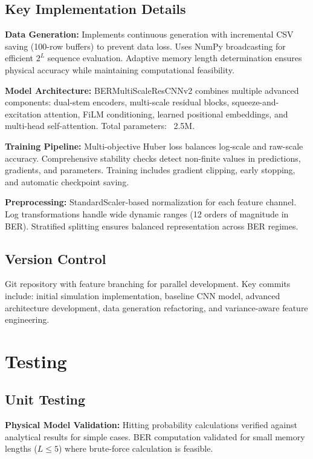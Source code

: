 \documentclass[a4paper,12pt]{report}
\begin{document}
\subsection{Key Implementation Details}

\textbf{Data Generation:} Implements continuous generation with incremental CSV saving (100-row buffers) to prevent data loss. Uses NumPy broadcasting for efficient $2^L$ sequence evaluation. Adaptive memory length determination ensures physical accuracy while maintaining computational feasibility.

\textbf{Model Architecture:} BERMultiScaleResCNNv2 combines multiple advanced components: dual-stem encoders, multi-scale residual blocks, squeeze-and-excitation attention, FiLM conditioning, learned positional embeddings, and multi-head self-attention. Total parameters: ~2.5M.

\textbf{Training Pipeline:} Multi-objective Huber loss balances log-scale and raw-scale accuracy. Comprehensive stability checks detect non-finite values in predictions, gradients, and parameters. Training includes gradient clipping, early stopping, and automatic checkpoint saving.

\textbf{Preprocessing:} StandardScaler-based normalization for each feature channel. Log transformations handle wide dynamic ranges (12 orders of magnitude in BER). Stratified splitting ensures balanced representation across BER regimes.

\subsection{Version Control}

Git repository with feature branching for parallel development. Key commits include: initial simulation implementation, baseline CNN model, advanced architecture development, data generation refactoring, and variance-aware feature engineering.

\section{Testing}

\subsection{Unit Testing}

\textbf{Physical Model Validation:} Hitting probability calculations verified against analytical results for simple cases. BER computation validated for small memory lengths ($L \leq 5$) where brute-force calculation is feasible.
\end{document}
